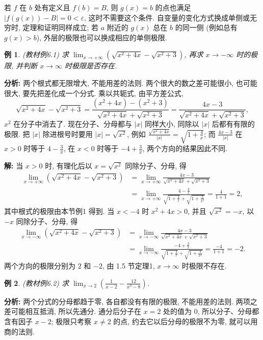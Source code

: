 \documentclass[UTF8,openany]{ctexbook}
\theoremstyle{chinesetextbook}
\newtheorem{example}{例}[section]
\newenvironment{cnsolution}{\par\indent\textbf{解:} \ignorespaces}{\par}
\begin{document}
若 $f$ 在 $b$ 处有定义且 $f(b)=B$, 则 $g(x)=b$ 的点也满足 $|f(g(x))-B|=0<\varepsilon$, 这时不需要这个条件. 自变量的变化方式换成单侧或无穷时, 定理和证明同样成立; 若 $a$ 附近的 $g(x)$ 总在 $b$ 的同一侧 (例如总有 $g(x)>b$), 外层的极限也可以换成相应的单侧极限.
\begin{example}
\textnormal{(教材例6.1)} 求 $\displaystyle\lim_{x\to+\infty}\left(\sqrt{x^2+4x}-\sqrt{x^2+3}\right)$, 再求 $x\to-\infty$ 时的极限, 并判断 $x\to\infty$ 时极限是否存在.
\end{example}
\par\indent\textbf{分析:} 两个根式都无限增大, 不能用差的法则. 两个很大的数之差可能很小, 也可能很大, 要先把差化成一个分式. 乘以共轭式, 由平方差公式,
\[
\sqrt{x^2+4x}-\sqrt{x^2+3}=\frac{(x^2+4x)-(x^2+3)}{\sqrt{x^2+4x}+\sqrt{x^2+3}}=\frac{4x-3}{\sqrt{x^2+4x}+\sqrt{x^2+3}},
\]
$x^2$ 在分子中消去了. 现在分子、分母都与 $|x|$ 同样大小, 同除以 $|x|$ 后都有有限的极限. 把 $|x|$ 除进根号时要用 $|x|=\sqrt{x^2}$, 例如 $\displaystyle\frac{\sqrt{x^2+4x}}{|x|}=\sqrt{1+\frac4x}$; 而 $\displaystyle\frac{4x-3}{|x|}$ 在 $x>0$ 时等于 $\displaystyle4-\frac3x$, 在 $x<0$ 时等于 $\displaystyle-4+\frac3x$, 两个方向的结果因此不同.
\begin{cnsolution}
当 $x>0$ 时, 有理化后以 $x=\sqrt{x^2}$ 同除分子、分母, 得
\[
\begin{aligned}
\lim_{x\to+\infty}\left(\sqrt{x^2+4x}-\sqrt{x^2+3}\right)
&=\lim_{x\to+\infty}\frac{4x-3}{\sqrt{x^2+4x}+\sqrt{x^2+3}}\\
&=\lim_{x\to+\infty}\frac{4-\frac3x}{\sqrt{1+\frac4x}+\sqrt{1+\frac3{x^2}}}=\frac4{1+1}=2,
\end{aligned}
\]
其中根式的极限由本节例1 得到. 当 $x<-4$ 时 $x^2+4x>0$, 并且 $\sqrt{x^2}=-x$, 以 $-x$ 同除分子、分母, 得
\[
\begin{aligned}
\lim_{x\to-\infty}\left(\sqrt{x^2+4x}-\sqrt{x^2+3}\right)
&=\lim_{x\to-\infty}\frac{4x-3}{\sqrt{x^2+4x}+\sqrt{x^2+3}}\\
&=\lim_{x\to-\infty}\frac{-4+\frac3x}{\sqrt{1+\frac4x}+\sqrt{1+\frac3{x^2}}}=\frac{-4}{1+1}=-2.
\end{aligned}
\]
两个方向的极限分别为 $2$ 和 $-2$, 由 1.5 节定理1, $x\to\infty$ 时极限不存在.
\end{cnsolution}
\begin{example}\label{ex:6-2}
\textnormal{(教材例6.2)} 求 $\displaystyle\lim_{x\to2}\left(\frac1{x-2}-\frac{12}{x^3-8}\right)$.
\end{example}
\par\indent\textbf{分析:} 两个分式的分母都趋于零, 各自都没有有限的极限, 不能用差的法则. 两项之差可能相互抵消, 所以先通分. 通分后分子在 $x=2$ 处的值为 $0$, 所以分子、分母都含有因子 $x-2$; 极限只考察 $x\ne2$ 的点, 约去它以后分母的极限不为零, 就可以用商的法则.
\end{document}

